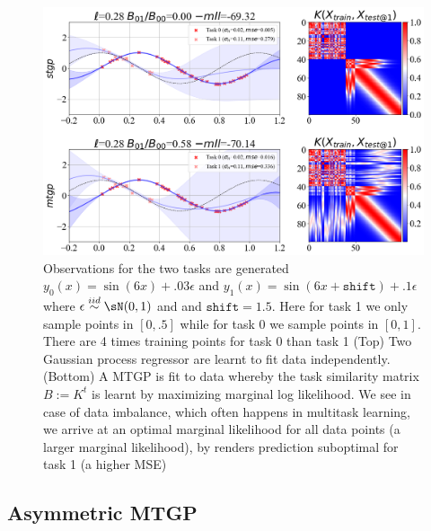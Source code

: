 \documentclass[11pt]{article}
\begin{document}
\begin{center} 
\begin{figure}[h!]
    \includegraphics[width=\textwidth]{assets/plt_mtgp_competitive.png}
    \caption{Observations for the two tasks are generated $y_0(x)=\sin(6x) + .03 \epsilon$ and $y_1(x)=\sin(6x + \texttt{shift}) + .1 \epsilon$ where $\epsilon\overset{iid}{\sim} \sN(0,1)$ and  and $\texttt{shift}=1.5$. Here for task 1 we only sample points in $[0,.5]$ while for task 0 we sample points in $[0,1]$. There are 4 times training points for task 0 than task 1 (Top) Two Gaussian process regressor are learnt to fit data independently. (Bottom) A MTGP is fit to data whereby the task similarity matrix $B:=K^t$ is learnt by maximizing marginal log likelihood. We see in case of data imbalance, which often happens in multitask learning, we arrive at an optimal marginal likelihood for all data points (a larger marginal likelihood), by renders prediction suboptimal for task 1 (a higher MSE)}
    \label{fig:plt_mtgp_competitive}
\end{figure}
\end{center} 

    

\subsection{Asymmetric MTGP}
\end{document}

